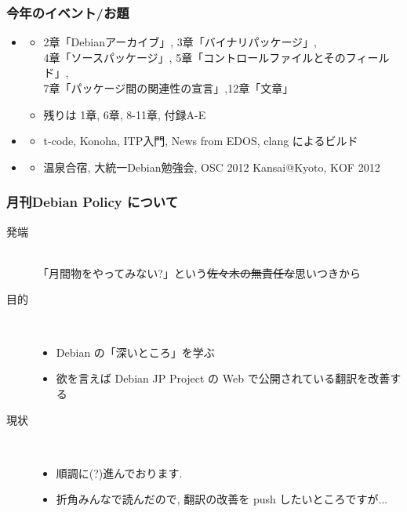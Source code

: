 \documentclass[cjk,dvipdfmx,10pt,compress,%
hyperref={bookmarks=true,bookmarksnumbered=true,bookmarksopen=false,%
colorlinks=false,%
pdftitle={第 67 回 関西 Debian 勉強会},%
pdfauthor={倉敷・のがた・佐々木・かわだ},%
pdfsubject={資料},%
}]{beamer}
\begin{document}
\begin{frame}
  \frametitle{今年のイベント/お題}
  \begin{itemize}
  \item \color[rgb]{1,0,0}{月間Debian Policy}
    \begin{itemize}
    \item
      2章「Debianアーカイブ」, 3章「バイナリパッケージ」, \\
      4章「ソースパッケージ」, 5章「コントロールファイルとそのフィールド」,\\
      7章「パッケージ間の関連性の宣言」,12章「文章」
    \item 残りは
      1章, 6章, 8-11章, 付録A-E
    \end{itemize}
  \item \color[rgb]{0,0,1}{パッケージ関連}
    \begin{itemize}
    \item t-code, Konoha, ITP入門, News from EDOS, clang によるビルド
    \end{itemize}
  \item \color[rgb]{0,.5,.5}{イベント}
    \begin{itemize}
    \item 温泉合宿, 大統一Debian勉強会, OSC 2012 Kansai@Kyoto, KOF 2012
    \end{itemize}
  \end{itemize}
\end{frame}

\begin{frame}
  \frametitle{月刊Debian Policy について}
  \begin{description}
  \item[発端]\mbox{~}\\
    「月間物をやってみない?」という\sout{佐々木の無責任な}思いつきから
  \item[目的]\mbox{~}\\
    \begin{itemize}
    \item
      Debian の「深いところ」を学ぶ
    \item
      欲を言えば Debian JP Project の Web で公開されている翻訳を改善する
    \end{itemize}
  \item[現状]\mbox{~}\\
    \begin{itemize}
    \item 順調に(?)進んでおります.
    \item 折角みんなで読んだので, 翻訳の改善を push したいところですが...
    \end{itemize}
  \end{description}
\end{frame}
\end{document}
